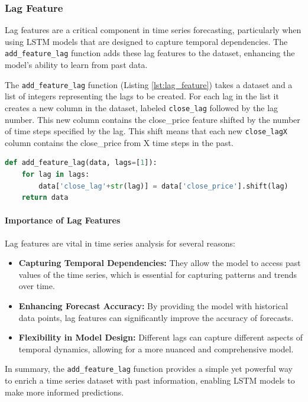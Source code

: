 \subsubsection{Lag Feature}

Lag features are a critical component in time series forecasting, particularly when using LSTM models that are designed to capture temporal dependencies. The \texttt{add\_feature\_lag} function adds these lag features to the dataset, enhancing the model's ability to learn from past data. \newline

The \texttt{add\_feature\_lag} function (Listing \ref{lst:lag_feature}) takes a dataset and a list of integers representing the lags to be created. For each lag in the list it creates a new column in the dataset, labeled \texttt{close\_lag} followed by the lag number. This new column contains the close\_price feature shifted by the number of time steps specified by the lag. This shift means that each new \texttt{close\_lagX} column contains the close\_price from X time steps in the past.

\begin{lstlisting}[language=python, caption={Lag Feature}, label=lst:lag_feature]
def add_feature_lag(data, lags=[1]): 
    for lag in lags: 
        data['close_lag'+str(lag)] = data['close_price'].shift(lag)
    return data
\end{lstlisting}

\paragraph{Importance of Lag Features}
Lag features are vital in time series analysis for several reasons:
\begin{itemize}
    \item \textbf{Capturing Temporal Dependencies:} They allow the model to access past values of the time series, which is essential for capturing patterns and trends over time.
    \item \textbf{Enhancing Forecast Accuracy:} By providing the model with historical data points, lag features can significantly improve the accuracy of forecasts.
    \item \textbf{Flexibility in Model Design:} Different lags can capture different aspects of temporal dynamics, allowing for a more nuanced and comprehensive model.
\end{itemize}

In summary, the \texttt{add\_feature\_lag} function provides a simple yet powerful way to enrich a time series dataset with past information, enabling LSTM models to make more informed predictions.

